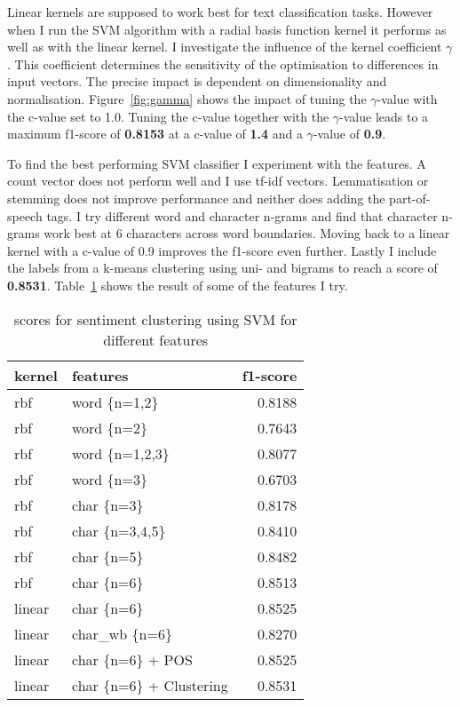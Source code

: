\documentclass[11pt]{article}
\begin{document}
Linear kernels are supposed to work best for text classification tasks. However when I run the SVM algorithm with a radial basis function kernel it performs as well as with the linear kernel. I investigate the influence of the kernel coefficient $\gamma$. This coefficient determines the sensitivity of the optimisation to differences in input vectors. The precise impact is dependent on dimensionality and normalisation. Figure~\ref{fig:gamma} shows the impact of tuning the $\gamma$-value with the c-value set to 1.0. Tuning the c-value together with the $\gamma$-value leads to a maximum f1-score of \textbf{0.8153} at a c-value of \textbf{1.4} and a $\gamma$-value of \textbf{0.9}.

To find the best performing SVM classifier I experiment with the features. A count vector does not perform well and I use tf-idf vectors. Lemmatisation or stemming does not improve performance and neither does adding the part-of-speech tags. I try different word and character n-grams and find that character n-grams work best at 6 characters across word boundaries. Moving back to a linear kernel with a c-value of 0.9 improves the f1-score even further. Lastly I include the labels from a k-means clustering using uni- and bigrams to reach a score of \textbf{0.8531}. Table~\ref{tab:svm-feat} shows the result of some of the features I try.

\begin{table}[ht]\footnotesize
\centering
\caption{scores for sentiment clustering using SVM for different features}
\label{tab:svm-feat}
\begin{tabular}{ l l r }
kernel & features & f1-score \\
\hline
rbf    &  word \{n=1,2\}            & 0.8188 \\
rbf    &  word \{n=2\}              & 0.7643 \\
rbf    &  word \{n=1,2,3\}          & 0.8077 \\
rbf    &  word \{n=3\}              & 0.6703 \\
rbf    &  char \{n=3\}              & 0.8178 \\
rbf    &  char \{n=3,4,5\}          & 0.8410 \\
rbf    &  char \{n=5\}              & 0.8482 \\
rbf    &  char \{n=6\}              & 0.8513 \\
linear &  char \{n=6\}              & 0.8525 \\
linear &  char\_wb \{n=6\}           & 0.8270 \\
linear &  char \{n=6\} + POS        & 0.8525 \\
linear &  char \{n=6\} + Clustering & 0.8531 \\
\end{tabular}
\end{table}
\end{document}
